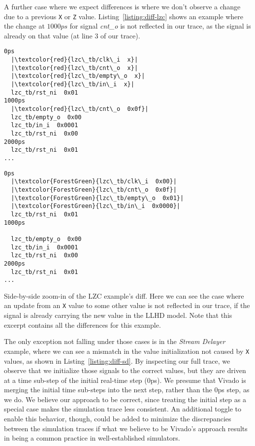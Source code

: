 A further case where we expect differences is where we don't observe a change due to a previous \texttt{X} or \texttt{Z} value. Listing~\ref{listing:diff-lzc} shows an example where the change at $1000ps$ for signal \textit{cnt\_o} is not reflected in our trace, as the signal is already on that value (at line $3$ of our trace).


\begin{listing}
  \lstset{
    escapeinside=||,
    basicstyle=\footnotesize\ttfamily,
    stepnumber=1
  }
  \begin{minipage}{0.45\textwidth}
    \begin{lstlisting}
0ps
  |\textcolor{red}{lzc\_tb/clk\_i  x}|
  |\textcolor{red}{lzc\_tb/cnt\_o  x}|
  |\textcolor{red}{lzc\_tb/empty\_o  x}|
  |\textcolor{red}{lzc\_tb/in\_i  x}|
  lzc_tb/rst_ni  0x01
1000ps
  |\textcolor{red}{lzc\_tb/cnt\_o  0x0f}|
  lzc_tb/empty_o  0x00
  lzc_tb/in_i  0x0001
  lzc_tb/rst_ni  0x00
2000ps
  lzc_tb/rst_ni  0x01
...
        \end{lstlisting}
  \end{minipage}
  \hfill
  \begin{minipage}{0.45\textwidth}
    \begin{lstlisting}
0ps
  |\textcolor{ForestGreen}{lzc\_tb/clk\_i  0x00}|
  |\textcolor{ForestGreen}{lzc\_tb/cnt\_o  0x0f}|
  |\textcolor{ForestGreen}{lzc\_tb/empty\_o  0x01}|
  |\textcolor{ForestGreen}{lzc\_tb/in\_i  0x0000}|
  lzc_tb/rst_ni  0x01
1000ps

  lzc_tb/empty_o  0x00
  lzc_tb/in_i  0x0001
  lzc_tb/rst_ni  0x00
2000ps
  lzc_tb/rst_ni  0x01
...
        \end{lstlisting}
  \end{minipage}
  \caption[Side-by-side zoom-in of the LZC example's diff.]{Side-by-side zoom-in of the LZC example's diff. Here we can see the case where an update from an \texttt{X} value to some other value is not reflected in our trace, if the signal is already carrying the new value in the LLHD model. Note that this excerpt contains all the differences for this example.}
  \label{listing:diff-lzc}
\end{listing}

The only exception not falling under those cases is in the \textit{Stream Delayer} example, where we can see a mismatch in the value initialization not caused by \texttt{X} values, as shown in Listing~\ref{listing:diff-sd}. By inspecting our full trace, we observe that we initialize those signals to the correct values, but they are driven at a time sub-step of the initial real-time step ($0$ps). We presume that Vivado is merging the initial time sub-steps into the next step, rather than the $0$ps step, as we do. We believe our approach to be correct, since treating the initial step as a special case makes the simulation trace less consistent. An additional toggle to enable this behavior, though, could be added to minimize the discrepancies between the simulation traces if what we believe to be Vivado's approach results in being a common practice in well-established simulators.

